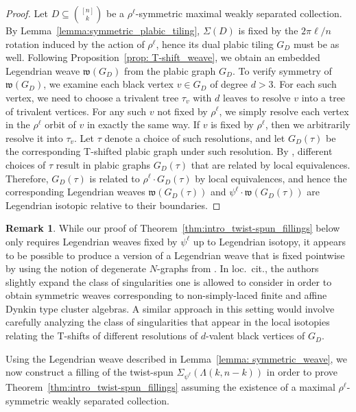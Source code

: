 \documentclass[11pt]{amsart}
\newcommand{\La}{\Lambda}
\newcommand{\w}{\mathfrak{w}}
\theoremstyle{plain}
\theoremstyle{definition}
\newtheorem{remark}[theorem]{Remark}
\begin{document}
 
\begin{proof}
Let $D \subseteq \binom{[n]}{k}$ be a $\rho^\ell$-symmetric maximal weakly separated collection. By Lemma~\ref{lemma:symmetric_plabic_tiling}, $\Sigma(D)$ is fixed by the $2\pi\ell/n$ rotation induced by the action of $\rho^\ell$, hence its dual plabic tiling $G_D$ must be as well. Following Proposition~\ref{prop: T-shift_weave}, we obtain an embedded Legendrian weave $\w(G_D)$ from the plabic graph $G_D$. To verify symmetry of $\w(G_D)$, we examine each black vertex $v\in G_D$ of degree $d > 3$. For each such vertex, we need to choose a trivalent tree $\tau_v$ with $d$ leaves to resolve $v$ into a tree of trivalent vertices. For any such $v$ not fixed by $\rho^\ell$, we simply resolve each vertex in the $\rho^\ell$ orbit of $v$ in exactly the same way. If $v$ is fixed by $\rho^\ell$, then we arbitrarily resolve it into $\tau_v$. Let $\tau$ denote a choice of such resolutions, and let $G_D(\tau)$ be the corresponding T-shifted plabic graph under such resolution. By \cite[Theorem 3.10 (3)]{CLSW2023}, different choices of $\tau$ result in plabic graphs $G_D(\tau)$ that are related by local equivalences. Therefore, $G_D(\tau)$ is related to $\rho^\ell\cdot G_D(\tau)$ by local equivalences, and hence the corresponding Legendrian weaves $\w(G_D(\tau))$ and $\psi^\ell\cdot \w(G_D(\tau))$ are Legendrian isotopic relative to their boundaries.
\end{proof}


\begin{remark}
 While our proof of Theorem~\ref{thm:intro_twist-spun_fillings} below only requires Legendrian weaves fixed by $\psi^\ell$ up to Legendrian isotopy, it appears to be possible to produce a version of a Legendrian weave that is fixed pointwise by using the notion of degenerate $N$-graphs from \cite{ABL22}. In loc.\ cit., the authors slightly expand the class of singularities one is allowed to consider in order to obtain symmetric weaves corresponding to non-simply-laced finite and affine Dynkin type cluster algebras. A similar approach in this setting would involve carefully analyzing the class of singularities that appear in the local isotopies relating the T-shifts of different resolutions of $d$-valent black vertices of $G_D$.
\end{remark}

Using the Legendrian weave described in Lemma~\ref{lemma: symmetric_weave}, we now construct a filling of the twist-spun $\Sigma_{\psi^\ell}(\La(k, n-k))$ in order to prove Theorem~\ref{thm:intro_twist-spun_fillings} assuming the existence of a maximal $\rho^\ell$-symmetric weakly separated collection. 
\end{document}
